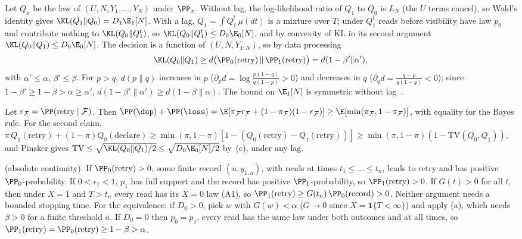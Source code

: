  Let $Q_x$ be the law of $(U,N,Y_1,\dots,Y_N)$ under $\PP_x$. Without lag, the log-likelihood ratio of $Q_1$ to $Q_0$ is $L_N$ (the $U$ terms cancel), so Wald's identity gives
$\KL(Q_1\|Q_0)=D_1\E_1[N]$. With a lag, $Q_1=\int Q_1^{t}\,\mu(dt)$ is a mixture over $T$; under $Q_1^t$ reads before visibility have law $p_0$ and contribute nothing to
$\KL(Q_0\|Q_1^t)$, so $\KL(Q_0\|Q_1^t)\le D_0\E_0[N]$, and by convexity of KL in its second argument $\KL(Q_0\|Q_1)\le D_0\E_0[N]$. The decision is a function of
$(U,N,Y_{1:N})$, so by data processing~\cite{cover2006elements}
\[
\KL(Q_0\|Q_1)\ge d\big(\PP_0(\text{retry})\,\|\,\PP_1(\text{retry})\big)=d(1-\beta'\|\alpha'),
\]
with $\alpha'\le\alpha$, $\beta'\le\beta$. For $p>q$, $d(p\|q)$ increases in $p$ ($\partial_pd=\log\frac{p(1-q)}{q(1-p)}>0$) and decreases in $q$ ($\partial_qd=\frac{q-p}{q(1-q)}<0$); since
$1-\beta'\ge1-\beta>\alpha\ge\alpha'$, $d(1-\beta'\|\alpha')\ge d(1-\beta\|\alpha)$. The bound on $\E_1[N]$ is symmetric without lag~\cite{kaufmann2016complexity}.

 Let $r_{\mathcal F}=\PP(\text{retry}\mid\mathcal F)$. Then $\PP(\dup)+\PP(\loss)=\E[\pi_{\mathcal F}r_{\mathcal F}+(1-\pi_{\mathcal F})(1-r_{\mathcal F})]\ge\E[\min(\pi_{\mathcal F},1-\pi_{\mathcal F})]$,
with equality for the Bayes rule. For the second claim, $\pi\,Q_1(\text{retry})+(1-\pi)Q_0(\text{declare})\ge\min(\pi,1-\pi)[1-(Q_0(\text{retry})-Q_1(\text{retry}))]\ge\min(\pi,1-\pi)(1-\mathrm{TV}(Q_0,Q_1))$,
and Pinsker gives $\mathrm{TV}\le\sqrt{\KL(Q_0\|Q_1)/2}\le\sqrt{D_0\E_0[N]/2}$ by~(c), under any lag.

 (absolute continuity). If $\PP_0(\text{retry})>0$, some finite record $(u,y_{1:n})$, with reads at times $t_1\le\dots\le t_n$, leads to retry and has
positive $\PP_0$-probability. If $0<\epsilon_1<1$, $p_1$ has full support and the record has positive $\PP_1$-probability, so $\PP_1(\text{retry})>0$. If $G(t)>0$ for all $t$, then under
$X{=}1$ and $T>t_n$ every read has its $X{=}0$ law (A1), so $\PP_1(\text{retry})\ge G(t_n)\,\PP_0(\text{record})>0$. Neither argument needs a bounded stopping time.
For the equivalence: if $D_0>0$, pick $w$ with $G(w)<\alpha$ ($G\to0$ since $X=\mathbf 1\{T<\infty\}$) and apply (a), which needs $\beta>0$ for a finite threshold $a$. If $D_0=0$ then $p_0=p_1$,
every read has the same law under both outcomes and at all times, so $\PP_1(\text{retry})=\PP_0(\text{retry})\ge1-\beta>\alpha$.


